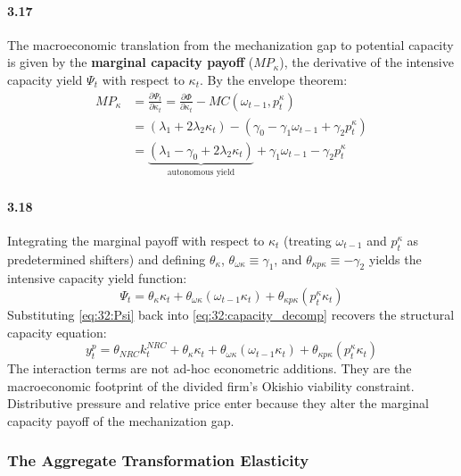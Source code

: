 \paragraph{3.17}
The macroeconomic translation from the mechanization gap to
potential capacity is given by the \textbf{marginal
	capacity payoff} ($MP_\kappa$), the derivative of the
intensive capacity yield $\Psi_t$ with respect to $\kappa_t$.
By the envelope theorem:
\begin{align}
	MP_\kappa &= \frac{\partial \Psi_t}{\partial \kappa_t}
	= \frac{\partial \Phi}{\partial \kappa_t}
	- MC(\omega_{t-1}, p^\kappa_t)
	\label{eq:32:MP_env} \\
	&= (\lambda_1 + 2\lambda_2 \kappa_t)
	- (\gamma_0 - \gamma_1 \omega_{t-1} + \gamma_2 p^\kappa_t)
	\label{eq:32:MP_expanded} \\
	&= \underbrace{(\lambda_1 - \gamma_0
		+ 2\lambda_2 \kappa_t)}_{\text{autonomous yield}}
	+ \gamma_1 \omega_{t-1} - \gamma_2 p^\kappa_t
	\label{eq:32:MP_rearranged}
\end{align}

\paragraph{3.18}
Integrating the marginal payoff with respect to $\kappa_t$
(treating $\omega_{t-1}$ and $p^\kappa_t$ as predetermined
shifters) and defining $\theta_\kappa$,
$\theta_{\omega\kappa} \equiv \gamma_1$, and
$\theta_{\kappa p\kappa} \equiv -\gamma_2$ yields the
intensive capacity yield function:
\begin{equation}
	\Psi_t = \theta_\kappa \kappa_t
	+ \theta_{\omega\kappa} (\omega_{t-1} \kappa_t)
	+ \theta_{\kappa p\kappa} (p^\kappa_t \kappa_t)
	\label{eq:32:Psi}
\end{equation}
Substituting \eqref{eq:32:Psi} back into
\eqref{eq:32:capacity_decomp} recovers the structural
capacity equation:
\begin{equation}
	y^p_t = \theta_{NRC} k^{NRC}_t + \theta_\kappa \kappa_t
	+ \theta_{\omega\kappa} (\omega_{t-1} \kappa_t)
	+ \theta_{\kappa p\kappa} (p^\kappa_t \kappa_t)
	\label{eq:32:capacity_eq}
\end{equation}
The interaction terms are not ad-hoc econometric additions.
They are the macroeconomic footprint of the divided firm's
Okishio viability constraint. Distributive pressure and
relative price enter because they alter the marginal
capacity payoff of the mechanization gap.

\subsubsection{The Aggregate Transformation Elasticity}

